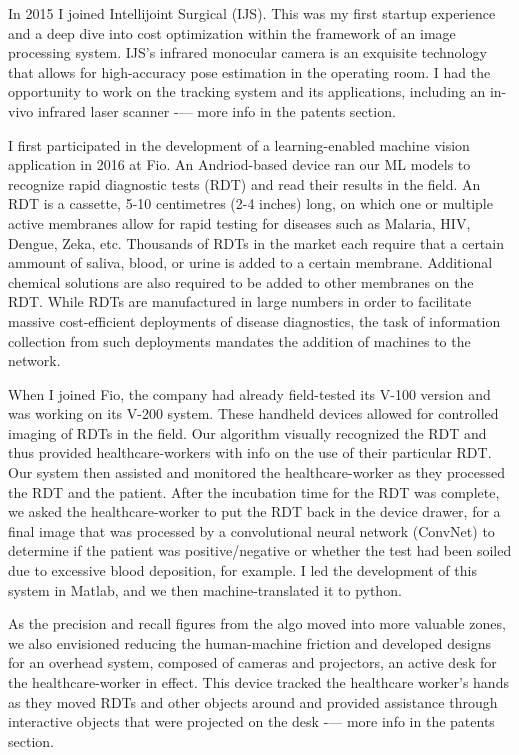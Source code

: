 \osspacing
In 2015 I joined Intellijoint Surgical (IJS). This was my first startup experience and a deep dive into cost optimization within the framework of an image processing system. IJS's infrared monocular camera is an exquisite technology that allows for high-accuracy pose estimation in the operating room. I had the opportunity to work on the tracking system and its applications, including an in-vivo infrared laser scanner -— more info in the patents section.

\osspacing
I first participated in the development of a learning-enabled machine vision application in 2016 at Fio. An Andriod-based device ran our ML models to recognize rapid diagnostic tests (RDT) and read their results in the field. An RDT is a cassette, 5-10 centimetres (2-4 inches) long, on which one or multiple active membranes allow for rapid testing for diseases such as Malaria, HIV, Dengue, Zeka, etc. Thousands of RDTs in the market each require that a certain ammount of saliva, blood, or urine is added to a certain membrane. Additional chemical solutions are also required to be added to other membranes on the RDT. While RDTs are manufactured in large numbers in order to facilitate massive cost-efficient deployments of disease diagnostics, the task of information collection from such deployments mandates the addition of machines to the network. 

\osspacing
When I joined Fio, the company had already field-tested its V-100 version and was working on its V-200 system. These handheld devices allowed for controlled imaging of RDTs in the field. Our algorithm visually recognized the RDT and thus provided healthcare-workers with info on the use of their particular RDT. Our system then assisted and monitored the healthcare-worker as they processed the RDT and the patient. After the incubation time for the RDT was complete, we asked the healthcare-worker to put the RDT back in the device drawer, for a final image that was processed by a convolutional neural network (ConvNet) to determine if the patient was positive/negative or whether the test had been soiled due to excessive blood deposition, for example. I led the development of this system in Matlab, and we then machine-translated it to python. 
 
\osspacing
As the precision and recall figures from the algo moved into more valuable zones, we also envisioned reducing the human-machine friction and developed designs for an overhead system, composed of cameras and projectors, an active desk for the healthcare-worker in effect. This device tracked the healthcare worker's hands as they moved RDTs and other objects around and provided assistance through interactive objects that were projected on the desk -— more info in the patents section.

